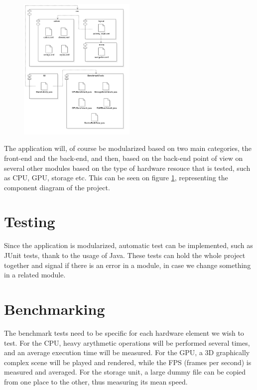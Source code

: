 \documentclass[a4paper,10pt]{report}
\begin{document}
 \begin{figure}
  \centering
  \caption{}
  \includegraphics[width=0.5\textwidth]{ComponentDiagram1.png}
  \label{fig:compDiag1}
 \end{figure}
 
 The application will, of course be modularized based on two main categories, the front-end and the back-end, and then, based on the back-end point of view on several other modules based on the type of hardware resouce that is tested, such as CPU, GPU, storage etc. This can be seen on figure \ref{fig:compDiag1}, representing the component diagram of the project.
 
 \section{Testing}
 Since the application is modularized, automatic test can be implemented, such as JUnit tests, thank to the usage of Java. These tests can hold the whole project together and signal if there is an error in a module, in case we change something in a related module.
 
 \pagebreak
 \section{Benchmarking}
 The benchmark tests need to be specific for each hardware element we wish to test. For the CPU, heavy arythmetic operations will be performed several times, and an average execution time will be measured. For the GPU, a 3D graphically complex scene will be played and rendered, while the FPS (frames per second) is measured and averaged. For the storage unit, a large dummy file can be copied from one place to the other, thus measuring its mean speed.
 
\end{document}
